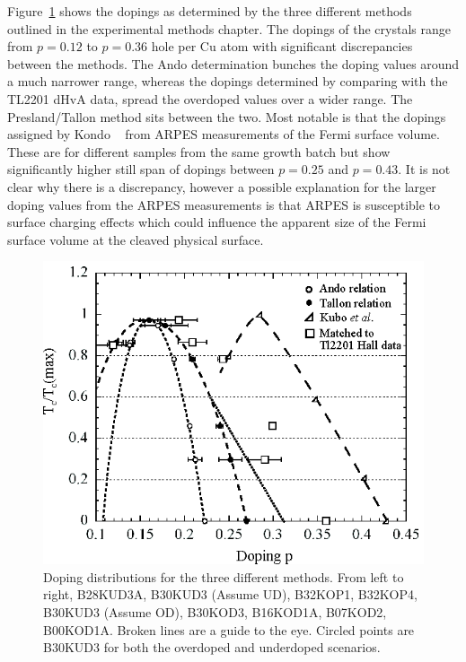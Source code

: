 Figure~\ref{Fig:ResH:Dopings} shows the dopings as determined by the three different methods outlined in the experimental methods chapter. The dopings of the crystals range from $p=0.12$ to $p=0.36$ hole per Cu atom with significant discrepancies between the methods. The Ando determination bunches the doping values around a much narrower range, whereas the dopings determined by comparing with the \ac{TL2201} \ac{dHvA} data, spread the overdoped values over a wider range. The Presland/Tallon method sits between the two. Most notable is that the dopings assigned by Kondo \etal~\cite{Kondo2004} from \ac{ARPES} measurements of the Fermi surface volume. These are for different samples from the same growth batch but show significantly higher still span of dopings between $p=0.25$ and $p=0.43$. It is not clear why there is a discrepancy, however a possible explanation for the larger doping values from the \ac{ARPES} measurements is that \ac{ARPES} is susceptible  to surface charging effects which could influence the apparent size of the Fermi surface volume at the cleaved physical surface.

\begin{figure}[htbp]
    \begin{center}
        \includegraphics[scale=1.1]{Chapter-HallBSCO/Figures/Dopings/Dopings}
        \caption{Doping distributions for the three different methods. From left to right, B28KUD3A, B30KUD3 (Assume UD), B32KOP1, B32KOP4, B30KUD3 (Assume OD), B30KOD3, B16KOD1A, B07KOD2, B00KOD1A. Broken lines are a guide to the eye. Circled points are B30KUD3 for both the overdoped and underdoped scenarios.}
        \label{Fig:ResH:Dopings}
    \end{center}
\end{figure}

